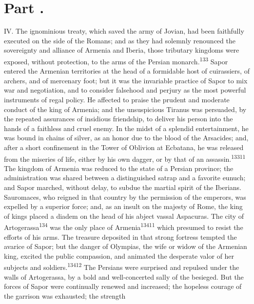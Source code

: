 
\section{Part \thesection.}

IV. The ignominious treaty, which saved the army of Jovian, had
been faithfully executed on the side of the Romans; and as they
had solemnly renounced the sovereignty and alliance of Armenia
and Iberia, those tributary kingdoms were exposed, without
protection, to the arms of the Persian monarch.\textsuperscript{133} Sapor entered
the Armenian territories at the head of a formidable host of
cuirassiers, of archers, and of mercenary foot; but it was the
invariable practice of Sapor to mix war and negotiation, and to
consider falsehood and perjury as the most powerful instruments
of regal policy. He affected to praise the prudent and moderate
conduct of the king of Armenia; and the unsuspicious Tiranus was
persuaded, by the repeated assurances of insidious friendship, to
deliver his person into the hands of a faithless and cruel enemy.
In the midst of a splendid entertainment, he was bound in chains
of silver, as an honor due to the blood of the Arsacides; and,
after a short confinement in the Tower of Oblivion at Ecbatana,
he was released from the miseries of life, either by his own
dagger, or by that of an assassin.\textsuperscript{13311} The kingdom of Armenia
was reduced to the state of a Persian province; the
administration was shared between a distinguished satrap and a
favorite eunuch; and Sapor marched, without delay, to subdue the
martial spirit of the Iberians. Sauromaces, who reigned in that
country by the permission of the emperors, was expelled by a
superior force; and, as an insult on the majesty of Rome, the
king of kings placed a diadem on the head of his abject vassal
Aspacuras. The city of Artogerassa\textsuperscript{134} was the only place of
Armenia\textsuperscript{13411} which presumed to resist the efforts of his arms.
The treasure deposited in that strong fortress tempted the
avarice of Sapor; but the danger of Olympias, the wife or widow
of the Armenian king, excited the public compassion, and animated
the desperate valor of her subjects and soldiers.\textsuperscript{13412} The
Persians were surprised and repulsed under the walls of
Artogerassa, by a bold and well-concerted sally of the besieged.
But the forces of Sapor were continually renewed and increased;
the hopeless courage of the garrison was exhausted; the strength

